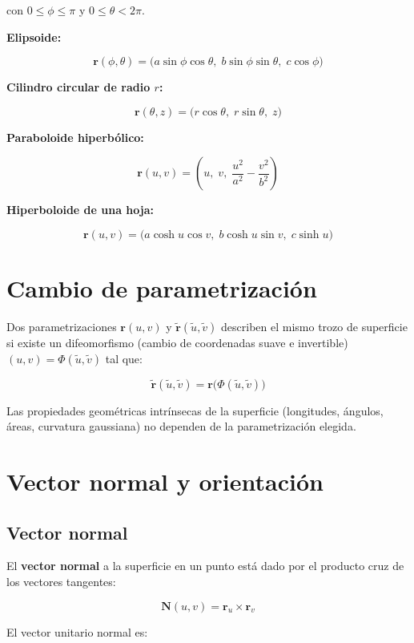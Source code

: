 \documentclass[
]{book}
\begin{document}
con \(0 \leq \phi \leq \pi\) y \(0 \leq \theta < 2\pi\).

\textbf{Elipsoide:}

\[
\mathbf{r}(\phi, \theta) = \bigl( a\sin\phi\cos\theta,\; b\sin\phi\sin\theta,\; c\cos\phi \bigr)
\]

\textbf{Cilindro circular de radio \(r\):}

\[
\mathbf{r}(\theta, z) = \bigl( r\cos\theta,\; r\sin\theta,\; z \bigr)
\]

\textbf{Paraboloide hiperbólico:}

\[
\mathbf{r}(u, v) = \left( u,\; v,\; \frac{u^2}{a^2} - \frac{v^2}{b^2} \right)
\]

\textbf{Hiperboloide de una hoja:}

\[
\mathbf{r}(u, v) = \bigl( a\cosh u \cos v,\; b\cosh u \sin v,\; c\sinh u \bigr)
\]

\section{Cambio de parametrización}\label{cambio-de-parametrizaciuxf3n}

Dos parametrizaciones \(\mathbf{r}(u, v)\) y \(\mathbf{\tilde{r}}(\tilde{u}, \tilde{v})\) describen el mismo trozo de superficie si existe un difeomorfismo (cambio de coordenadas suave e invertible) \((u, v) = \Phi(\tilde{u}, \tilde{v})\) tal que:

\[
\mathbf{\tilde{r}}(\tilde{u}, \tilde{v}) = \mathbf{r}\bigl( \Phi(\tilde{u}, \tilde{v}) \bigr)
\]

Las propiedades geométricas intrínsecas de la superficie (longitudes, ángulos, áreas, curvatura gaussiana) no dependen de la parametrización elegida.

\section{Vector normal y orientación}\label{vector-normal-y-orientaciuxf3n}

\subsection{Vector normal}\label{vector-normal}

El \textbf{vector normal} a la superficie en un punto está dado por el producto cruz de los vectores tangentes:

\[
\mathbf{N}(u, v) = \mathbf{r}_u \times \mathbf{r}_v
\]

El vector unitario normal es:
\end{document}

